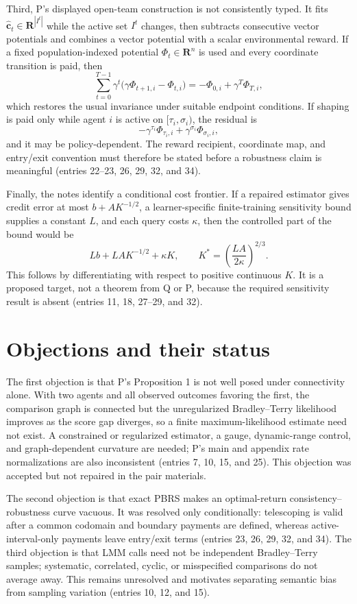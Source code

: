 \documentclass{article}
\begin{document}
Third, P's displayed open-team construction is not consistently typed. It fits \(\widehat{\mathbf c}_t\in\mathbf R^{|I^t|}\) while the active set \(I^t\) changes, then subtracts consecutive vector potentials and combines a vector potential with a scalar environmental reward. If a fixed population-indexed potential \(\Phi_t\in\mathbf R^n\) is used and every coordinate transition is paid, then
\[
 \sum_{t=0}^{T-1}\gamma^t
 \bigl(\gamma\Phi_{t+1,i}-\Phi_{t,i}\bigr)
 =-\Phi_{0,i}+\gamma^T\Phi_{T,i},
\]
which restores the usual invariance under suitable endpoint conditions. If shaping is paid only while agent \(i\) is active on \([\tau_i,\sigma_i)\), the residual is
\[
 -\gamma^{\tau_i}\Phi_{\tau_i,i}
 +\gamma^{\sigma_i}\Phi_{\sigma_i,i},
\]
and it may be policy-dependent. The reward recipient, coordinate map, and entry/exit convention must therefore be stated before a robustness claim is meaningful (entries 22--23, 26, 29, 32, and 34).

Finally, the notes identify a conditional cost frontier. If a repaired estimator gives credit error at most \(b+AK^{-1/2}\), a learner-specific finite-training sensitivity bound supplies a constant \(L\), and each query costs \(\kappa\), then the controlled part of the bound would be
\[
 Lb+LAK^{-1/2}+\kappa K,
 \qquad
 K^*=\left(\frac{LA}{2\kappa}\right)^{2/3}.
\]
This follows by differentiating with respect to positive continuous \(K\). It is a proposed target, not a theorem from Q or P, because the required sensitivity result is absent (entries 11, 18, 27--29, and 32).

\section*{Objections and their status}
The first objection is that P's Proposition 1 is not well posed under connectivity alone. With two agents and all observed outcomes favoring the first, the comparison graph is connected but the unregularized Bradley--Terry likelihood improves as the score gap diverges, so a finite maximum-likelihood estimate need not exist. A constrained or regularized estimator, a gauge, dynamic-range control, and graph-dependent curvature are needed; P's main and appendix rate normalizations are also inconsistent (entries 7, 10, 15, and 25). This objection was accepted but not repaired in the pair materials.

The second objection is that exact PBRS makes an optimal-return consistency--robustness curve vacuous. It was resolved only conditionally: telescoping is valid after a common codomain and boundary payments are defined, whereas active-interval-only payments leave entry/exit terms (entries 23, 26, 29, 32, and 34). The third objection is that LMM calls need not be independent Bradley--Terry samples; systematic, correlated, cyclic, or misspecified comparisons do not average away. This remains unresolved and motivates separating semantic bias from sampling variation (entries 10, 12, and 15).
\end{document}
